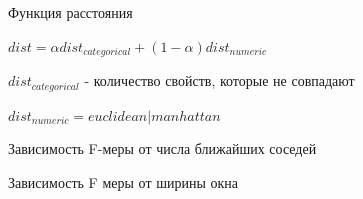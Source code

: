 \begin{para}{Функция расстояния}

$dist = \alpha dist_{categorical} + (1 - \alpha)dist_{numeric}$

$dist_{categorical}$ - количество свойств, которые не совпадают

$dist_{numeric} = euclidean | manhattan$


\end{para}

\begin{para}{Зависимость F-меры от числа ближайших соседей}

\begin{figure}[h]
\label{ris:f_measure_from_k}
\end{figure}

\end{para}

\begin{para}{Зависимость F меры от ширины окна}

\begin{figure}[h]
\label{ris:f_measure_from_window}
\end{figure}

\end{para}